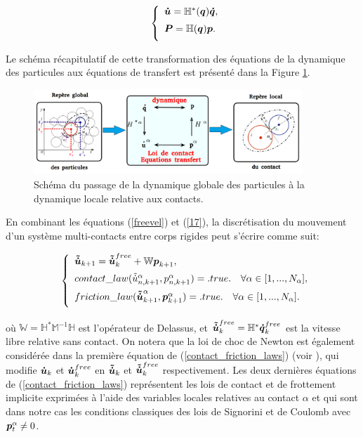 \begin{eqnarray}
&& \left\{\begin{array}{lll}
\boldsymbol{\dot{u}} = \mathbb{H}^{*}(\boldsymbol{q}) \boldsymbol{\dot{q}},\\[2mm]
\boldsymbol{P} = \mathbb{H}(\boldsymbol{q}) \boldsymbol{p}.\\[2mm]
\end{array}\right.
\label{17}
\end{eqnarray}

Le schéma récapitulatif de cette transformation des équations de la dynamique des particules aux équations de transfert est présenté dans la Figure \ref{passage_loc_glob}.

\begin{figure}[!h]
  \centering
    \includegraphics[width=0.9\textwidth]{chapitres/chapitre_3/figures/matrice_passage_glob-loc.png}
    \caption{Schéma du passage de la dynamique globale des particules à la dynamique locale relative aux contacts.}\label{passage_loc_glob}
\end{figure}

En combinant les équations (\ref{freevel}) et (\ref{17}), la discrétisation du mouvement d'un système multi-contacts entre corps rigides peut s'écrire comme suit:

\begin{eqnarray}
&& \left\{\begin{array}{lll}
\boldsymbol{\tilde{\dot{u}}}_{k+1} = \boldsymbol{\tilde{\dot{u}}}_{k}^{free} + \mathbb{W} \boldsymbol{p}_{k+1},\\[2mm]
contact\_law(\tilde{\dot{u}}_{n,k+1}^{\alpha},p_{n,k+1}^{\alpha}) = .true. \quad \forall \alpha \in [1,...,N_{\alpha}],\\[2mm]
friction\_law(\boldsymbol{\tilde{\dot{u}}}_{k+1}^{\alpha},\boldsymbol{p}_{k+1}^{\alpha}) = .true. \quad \forall \alpha \in [1,...,N_{\alpha}].\\[2mm]
\end{array}\right.
\label{contact_friction_laws}
\end{eqnarray}

où $\mathbb{W} = \mathbb{H}^{*} \mathbb{M}^{-1} \mathbb{H}$ est l'opérateur de Delassus, et $\boldsymbol{\tilde{\dot{u}}}_{k}^{free} = \mathbb{H}^{*} \boldsymbol{\dot{q}}_{k}^{free}$ est la vitesse libre relative sans contact. On notera que la loi de choc de Newton est également considérée dans la première équation de (\ref{contact_friction_laws}) (voir \cite{moreau1988unilateral}), qui modifie $\boldsymbol{\dot{u}}_{k}$ et $\boldsymbol{\dot{u}}_{k}^{free}$ en $\boldsymbol{\tilde{\dot{u}}}_{k}$ et $\boldsymbol{\tilde{\dot{u}}}_{k}^{free}$ respectivement. Les deux dernières équations de (\ref{contact_friction_laws}) représentent les lois de contact et de frottement implicite exprimées à l'aide des variables locales  relatives au contact $\alpha$ et qui sont dans notre cas les conditions classiques des lois de Signorini et de Coulomb avec $\boldsymbol{p}^{\alpha}_t \neq 0$.

